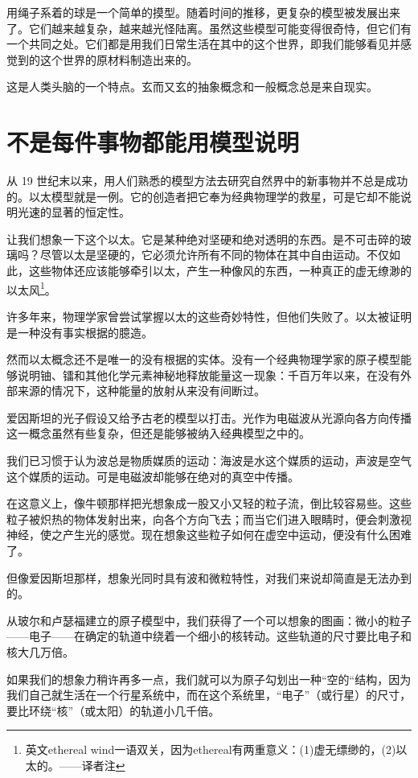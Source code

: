 用绳子系着的球是一个简单的摸型。随着时间的推移，更复杂的模型被发展出来了。它们越来越复杂，越来越光怪陆离。虽然这些模型可能变得很奇恃，但它们有一个共同之处。它们都是用我们日常生活在其中的这个世界，即我们能够看见并感觉到的这个世界的原材料制造出来的。

这是人类头脑的一个特点。玄而又玄的抽象概念和一般概念总是来自现实。

\section{不是每件事物都能用模型说明}

从 19 世纪末以来，用人们熟悉的模型方法去研究自然界中的新事物并不总是成功的。以太模型就是一例。它的创造者把它奉为经典物理学的救星，可是它却不能说明光速的显著的恒定性。

让我们想象一下这个以太。它是某种绝对坚硬和绝对透明的东西。是不可击碎的玻璃吗？尽管以太是坚硬的，它必须允许所有不同的物体在其中自由运动。不仅如此，这些物体还应该能够牵引以太，产生一种像风的东西，一种真正的虚无缭渺的以太风\footnote{英文ethereal wind一语双关，因为ethereal有两重意义：(1)虚无缥缈的，(2)以太的。——译者注}。

许多年来，物理学家曾尝试掌握以太的这些奇妙特性，但他们失败了。以太被证明是一种没有事实根据的臆造。

然而以太概念还不是唯一的没有根据的实体。没有一个经典物理学家的原子模型能够说明铀、镭和其他化学元素神秘地释放能量这一现象：千百万年以来，在没有外部来源的情况下，这种能量的放射从来没有间断过。

爱因斯坦的光子假设又给予古老的模型以打击。光作为电磁波从光源向各方向传播这一概念虽然有些复杂，但还是能够被纳入经典模型之中的。

我们已习惯于认为波总是物质媒质的运动：海波是水这个媒质的运动，声波是空气这个媒质的运动。可是电磁波却能够在绝对的真空中传播。

在这意义上，像牛顿那样把光想象成一股又小又轻的粒子流，倒比较容易些。这些粒子被炽热的物体发射出来，向各个方向飞去；而当它们进入眼睛时，便会刺激视神经，使之产生光的感觉。现在想象这些粒子如何在虚空中运动，便没有什么困难了。

但像爱因斯坦那样，想象光同时具有波和微粒特性，对我们来说却简直是无法办到的。

从玻尔和卢瑟福建立的原子模型中，我们获得了一个可以想象的图画：微小的粒子——电子——在确定的轨道中绕着一个细小的核转动。这些轨道的尺寸要比电子和核大几万倍。

如果我们的想象力稍许再多一点，我们就可以为原子勾划出一种“空的“结构，因为我们自己就生活在一个行星系统中，而在这个系统里，“电子”（或行星）的尺寸，要比环绕“核”（或太阳）的轨道小几千倍。

